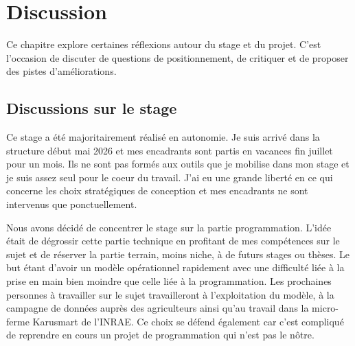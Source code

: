 \chapter{Discussion}
\label{ch:discussion}
%



Ce chapitre explore certaines réflexions autour du stage et du projet. C'est l'occasion de 
discuter de questions de positionnement, de critiquer et de proposer des pistes d'améliorations.

\section{Discussions sur le stage}
\label{sec:disc-stage}

Ce stage a été majoritairement réalisé en autonomie. Je suis arrivé dans la structure début 
mai 2026 et mes encadrants sont partis en vacances fin juillet pour un mois. Ils ne sont pas 
formés aux outils que je mobilise dans mon stage et je suis assez seul pour le coeur du travail.
J'ai eu une grande liberté en ce qui concerne les choix stratégiques de conception et mes encadrants
ne sont intervenus que ponctuellement.

Nous avons décidé de concentrer le stage sur la partie programmation. L'idée était de dégrossir 
cette partie technique en profitant de mes compétences sur le sujet et de réserver la partie 
terrain, moins niche, à de futurs stages ou thèses. Le but étant d'avoir un modèle opérationnel 
rapidement avec une difficulté liée à la prise en main bien moindre que celle liée à la programmation.
Les prochaines personnes à travailler sur le sujet travailleront à l'exploitation du modèle, à 
la campagne de données auprès des agriculteurs ainsi qu'au travail dans la micro-ferme Karusmart 
de l'INRAE. Ce choix se défend également car c'est compliqué de reprendre en cours un projet de programmation
qui n'est pas le nôtre.

